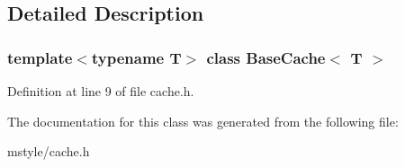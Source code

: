 \subsection{Detailed Description}
\subsubsection*{template$<$typename T$>$\newline
class Base\+Cache$<$ T $>$}



Definition at line 9 of file cache.\+h.



The documentation for this class was generated from the following file\+:\begin{DoxyCompactItemize}
\item 
mstyle/cache.\+h\end{DoxyCompactItemize}

